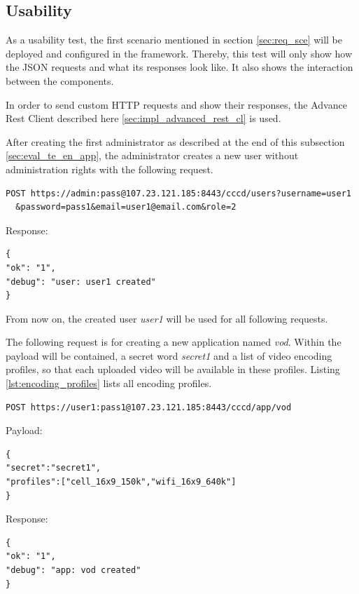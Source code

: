 \subsection{Usability\label{seq:eval_usab}}
As a usability test, the first scenario mentioned in section \ref{sec:req_sce} will be deployed and configured in the framework. Thereby, this test will only show how the \ac{JSON} requests and what its responses look like. It also shows the interaction between the components.

In order to send custom \ac{HTTP} requests and show their responses, the Advance Rest Client described here \ref{sec:impl_advanced_rest_cl} is used.

After creating the first administrator as described at the end of this subsection \ref{sec:eval_te_en_app}, the administrator creates a new user without administration rights with the following request.
\begin{code}
\begin{verbatim}
POST https://admin:pass@107.23.121.185:8443/cccd/users?username=user1
  &password=pass1&email=user1@email.com&role=2
\end{verbatim}
Response:
\begin{verbatim}
{
"ok": "1",
"debug": "user: user1 created"
}
\end{verbatim}
\end{code}

From now on, the created user \textit{user1} will be used for all following requests.

The following request is for creating a new application named \textit{vod}. Within the payload will be contained, a secret word \textit{secret1} and a list of video encoding profiles, so that each uploaded video will be available in these profiles. Listing \ref{lst:encoding_profiles} lists all encoding profiles.

\begin{code}
\begin{verbatim}
POST https://user1:pass1@107.23.121.185:8443/cccd/app/vod
\end{verbatim}
Payload:
\begin{verbatim}
{
"secret":"secret1",
"profiles":["cell_16x9_150k","wifi_16x9_640k"]
}
\end{verbatim}
Response:
\begin{verbatim}
{
"ok": "1",
"debug": "app: vod created"
}
\end{verbatim}
\end{code}
 
